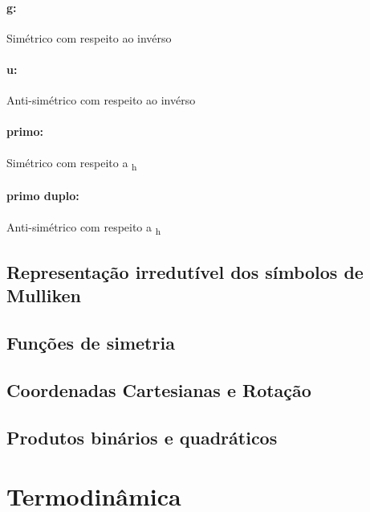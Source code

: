 \documentclass{article}
\begin{document}
\begin{multicols}{2}
			
\paragraph{g:} Simétrico com respeito ao invérso
\paragraph{u:} Anti-simétrico com respeito ao invérso

\vfill

\paragraph{primo:}	Simétrico com respeito a 
				\chemsigma\textsubscript{h}

\paragraph{primo duplo:} Anti-simétrico com respeito a
					\chemsigma\textsubscript{h}

\end{multicols}

\subsection{Representação irredutível dos símbolos de Mulliken}
\label{character tables representacao irredutivel mulliken}

\subsection*{Funções de simetria}
\label{character tables funcoes de simetria}

\subsection{Coordenadas Cartesianas e Rotação}
\label{character tables coordenadas cartesianas e rotacao}

\subsection{Produtos binários e quadráticos}
\label{character tables produtos binarios e quadraticos}

\section{Termodinâmica}
\label{termodinamica}
\end{document}
